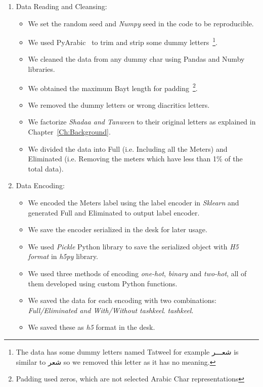 \begin{enumerate}
 \item Data Reading and Cleansing:
 \begin{itemize}
 \item We set the random seed and \textit{Numpy} seed in the code to be reproducible.
 \item We used PyArabic~\cite{Pyarabic_2010} to trim and strip some dummy letters~\footnote{The data has some dummy letters named Tatweel for example \textarabic{شعـــر} is similar to \textarabic{شعر} so we removed this letter as it has no meaning.}.
 \item We cleaned the data from any dummy char using Pandas and Numby libraries.
 \item We obtained the maximum Bayt length for padding~\footnote{Padding used zeros, which are not selected Arabic Char representations}.
 \item We removed the dummy letters or wrong diacritics letters.
 \item We factorize \textit{Shadaa and Tanween} to their original letters as explained in Chapter~\ref{Ch:Background}.
 \item We divided the data into Full (i.e. Including all the Meters) and Eliminated (i.e. Removing the meters which have less than 1\% of the total data).
 \end{itemize}
 
 \item Data Encoding:
 \begin{itemize}

 \item We encoded the Meters label using the label encoder in \textit{Sklearn} and generated Full and Eliminated to output label encoder.
 \item We save the encoder serialized in the desk for later usage.
 \item We used \textit{Pickle} Python library to save the serialized object with \textit{H5 format} in \textit{h5py} library.
 \item We used three methods of encoding \textit{one-hot}, \textit{binary} and \textit{two-hot}, all of them developed using custom Python functions.
 \item We saved the data for each encoding with two combinations: \textit{Full/Eliminated and With/Without \textit{tashkeel}}. \textit{tashkeel}.
 \item We saved these as \textit{h5} format in the desk.
 \end{itemize}


\end{enumerate}
